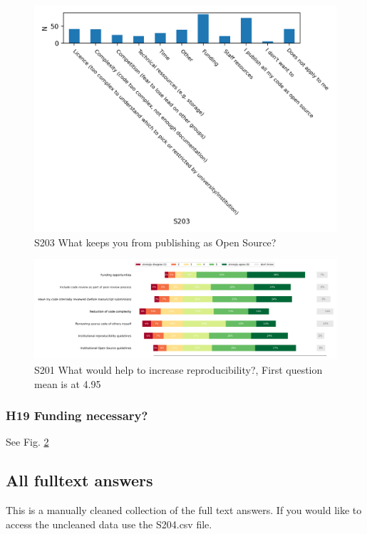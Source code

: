 \documentclass{article}
\begin{document}
\begin{figure}[!p]
    \centering
    \includegraphics[width=\textwidth]{../figs/S203.png}
	\caption{S203 What keeps you from publishing as Open Source?}
    \label{fig:S203}
\end{figure}

\begin{figure}[!p]
    \centering
    \includegraphics[width=\textwidth]{../figs/S201.png}
	\caption{S201 What would help to increase reproducibility?, First question mean is at 4.95}
    \label{fig:S201}
\end{figure}

\subsubsection{H19 Funding necessary?}
See Fig. \ref{fig:S201}

\newpage

\subsection{All fulltext answers}
This is a manually cleaned collection of the full text answers.
If you would like to access the uncleaned data use the S204.csv file.
\end{document}
